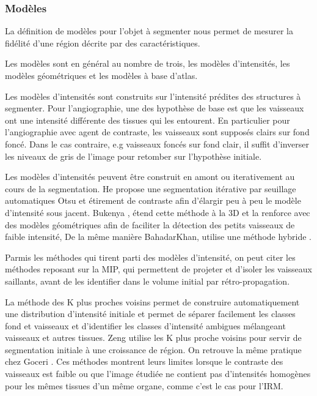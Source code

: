 \subsubsection{Modèles}

La définition de modèles pour l'objet à segmenter nous permet de mesurer la fidélité d'une région décrite par des caractéristiques.

Les modèles sont en général au nombre de trois, les modèles d'intensités, les modèles géométriques et les modèles à base d'atlas.

Les modèles d'intensités sont construits sur l'intensité prédites des structures à segmenter. Pour l'angiographie, une des hypothèse de base est que les vaisseaux ont une intensité différente des tissues qui les entourent. En particulier pour l'angiographie avec agent de contraste, les vaisseaux sont supposés clairs sur fond foncé. Dans le cas contraire, e.g vaisseaux foncés sur fond clair, il suffit d'inverser les niveaux de gris de l'image pour retomber sur l'hypothèse initiale.

Les modèles d'intensités peuvent être construit en amont ou iterativement au cours de la segmentation. He \cite{He2013_multi_otsu} propose une segmentation itérative par seuillage automatiques Otsu et étirement de contraste afin d'élargir peu à peu le modèle d'intensité sous jacent. Bukenya \cite{bukenya2016_heart_otsu_top_hat_hessian}, étend cette méthode à la 3D et la renforce avec des modèles géométriques afin de faciliter la détection des petits vaisseaux de faible intensité, De la même manière BahadarKhan, utilise une méthode hybride \cite{Bahadarkhan2016_fundus_region_based_otsu}.

Parmis les méthodes qui tirent parti des modèles d'intensité, on peut citer les méthodes reposant sur la MIP, qui permettent de projeter et d'isoler les vaisseaux saillants, avant de les identifier dans le volume initial par rétro-propagation.

La méthode des K plus proches voisins permet de construire automatiquement une distribution d'intensité initiale et permet de séparer facilement les classes fond et vaisseaux et d'identifier les classes d'intensité ambigues mélangeant vaisseaux et autres tissues. Zeng \cite{Zeng2018_auto_RG_AC_hepatic_vessels} utilise les K plus proche voisins pour servir de segmentation initiale à une croissance de région. On retrouve la même pratique chez Goceri \cite{Goceri2017_vessel}. Ces méthodes montrent leurs limites lorsque le contraste des vaisseaux est faible ou que l'image étudiée ne contient pas d'intensités homogènes pour les mêmes tissues d'un même organe, comme c'est le cas pour l'IRM.

